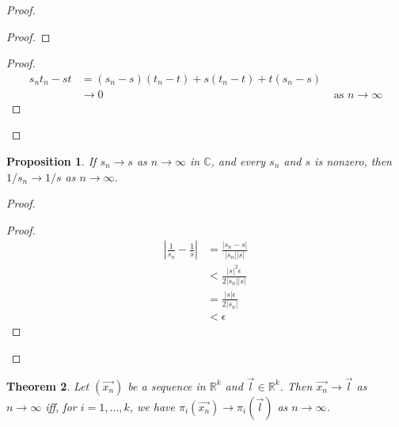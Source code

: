 \documentclass{book}
\let\qed\relax
\newtheorem{prop}{Proposition}[chapter]
\newtheorem{thm}[prop]{Theorem}
\theoremstyle{definition}
\begin{document}
\begin{proof}
\pf
{}
\begin{proof}
\end{proof}
\begin{proof}
	\pf
	\begin{align*}
		s_n t_n - st & = (s_n - s)(t_n - t) + s(t_n - t) + t(s_n - s) \\
		& \rightarrow 0 & \text{ as } n \rightarrow \infty
	\end{align*}
\end{proof}
\qed
\end{proof}

\begin{prop}
If $s_n \rightarrow s$ as $n \rightarrow \infty$ in $\mathbb{C}$, and every $s_n$ and $s$ is nonzero, then $1/s_n \rightarrow 1/s$ as $n \rightarrow \infty$.
\end{prop}

\begin{proof}
\pf
{}
\begin{proof}
	\pf
	\begin{align*}
		\left| \frac{1}{s_n} - \frac{1}{s} \right|
		& = \frac{|s_n - s|}{|s_n||s|} \\
		& < \frac{|s|^2 \epsilon}{2 |s_n| |s|} \\
		& = \frac{|s| \epsilon}{2 |s_n|} \\
		& < \epsilon
	\end{align*}
\end{proof}
\qed
\end{proof}

\begin{thm}
Let $(\vec{x_n})$ be a sequence in $\mathbb{R}^k$ and $\vec{l} \in \mathbb{R}^k$. Then $\vec{x_n} \rightarrow \vec{l}$ as $n \rightarrow \infty$ iff, for $i = 1, \ldots, k$, we have $\pi_i(\vec{x_n}) \rightarrow \pi_i(\vec{l})$ as $n \rightarrow \infty$.
\end{thm}
\end{document}
